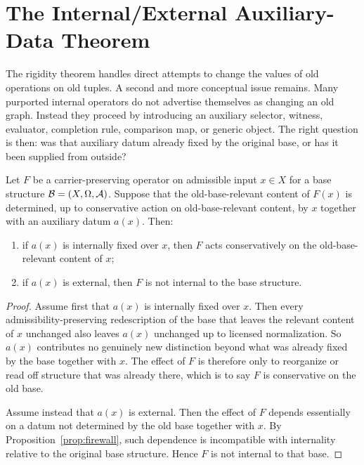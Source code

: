 \section{The Internal/External Auxiliary-Data Theorem}\label{sec:auxiliary-data}

The rigidity theorem handles direct attempts to change the values of old operations on old tuples. A second and more conceptual issue remains. Many purported internal operators do not advertise themselves as changing an old graph. Instead they proceed by introducing an auxiliary selector, witness, evaluator, completion rule, comparison map, or generic object. The right question is then: was that auxiliary datum already fixed by the original base, or has it been supplied from outside?

\begin{theorem}\label{thm:auxiliary-dichotomy}
Let $F$ be a carrier-preserving operator on admissible input $x\in X$ for a base structure $\mathcal{B}=(X,\Omega,\mathcal{A})$. Suppose that the old-base-relevant content of $F(x)$ is determined, up to conservative action on old-base-relevant content, by $x$ together with an auxiliary datum $a(x)$. Then:
\begin{enumerate}[label=(\alph*)]
    \item if $a(x)$ is internally fixed over $x$, then $F$ acts conservatively on the old-base-relevant content of $x$;
    \item if $a(x)$ is external, then $F$ is not internal to the base structure.
\end{enumerate}
\end{theorem}

\begin{proof}
Assume first that $a(x)$ is internally fixed over $x$. Then every admissibility-preserving redescription of the base that leaves the relevant content of $x$ unchanged also leaves $a(x)$ unchanged up to licensed normalization. So $a(x)$ contributes no genuinely new distinction beyond what was already fixed by the base together with $x$. The effect of $F$ is therefore only to reorganize or read off structure that was already there, which is to say $F$ is conservative on the old base.

Assume instead that $a(x)$ is external. Then the effect of $F$ depends essentially on a datum not determined by the old base together with $x$. By Proposition~\ref{prop:firewall}, such dependence is incompatible with internality relative to the original base structure. Hence $F$ is not internal to that base.
\end{proof}

